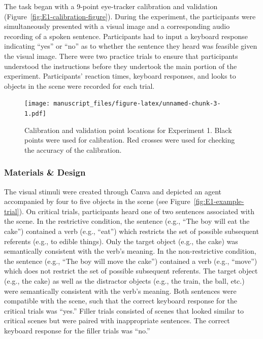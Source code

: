 \documentclass[
  man,floatsintext]{apa6}
\begin{document}
The task began with a 9-point eye-tracker calibration
and validation (Figure~\ref{fig:E1-calibration-figure}).
During the experiment, the participants were
simultaneously presented with a visual image and a corresponding audio
recording of a spoken sentence. Participants had to input a keyboard
response indicating ``yes'' or ``no'' as to whether the sentence they heard
was feasible given the visual image. There were two practice trials to
ensure that participants understood the instructions
before they undertook the main portion of the experiment. Participants'
reaction times, keyboard responses, and looks to objects in the scene
were recorded for each trial.

\begin{figure}
\centering
\texttt{[image: manuscript\_files/figure-latex/unnamed-chunk-3-1.pdf]}
\caption{\label{fig:unnamed-chunk-3}Calibration and validation point locations for Experiment 1. Black points were used for calibration. Red crosses were used for checking the accuracy of the calibration.}
\end{figure}

\hypertarget{materials-design}{%
\subsubsection{Materials \& Design}\label{materials-design}}

The visual stimuli were created through Canva and depicted an agent
accompanied by four to five objects in the scene (see Figure~\ref{fig:E1-example-trial}). On
critical trials, participants heard one of two sentences associated with
the scene. In the restrictive condition, the sentence (e.g., ``The boy
will eat the cake'') contained a verb (e.g., ``eat'') which restricts the
set of possible subsequent referents (e.g., to edible things). Only the
target object (e.g., the cake) was semantically consistent with the
verb's meaning. In the non-restrictive condition, the sentence (e.g.,
``The boy will move the cake'') contained a verb (e.g., ``move'') which does
not restrict the set of possible subsequent referents. The target object
(e.g., the cake) as well as the distractor objects (e.g., the train, the
ball, etc.) were semantically consistent with the verb's meaning. Both
sentences were compatible with the scene, such that the correct keyboard
response for the critical trials was ``yes.'' Filler trials consisted of
scenes that looked similar to critical scenes but were paired with
inappropriate sentences. The correct keyboard response for the filler
trials was ``no.''
\end{document}

